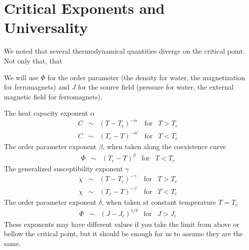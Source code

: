 


\section{Critical Exponents and Universality}
\label{sec:universality}

We noted that several thermodynamical quantities diverge on the critical point.
Not only that, that

We will use $\Phi$ for the order parameter (the density for water, the
magnetization for ferromagnets) and $J$ for the source field (pressure for
water, the external magnetic field for ferromagnets).

The heat capacity exponent $\alpha$
\begin{equation}
    \begin{array}{ccccc}
        C & \sim & {\left(T-T_c\right)}^{-\alpha}  & \mbox{for} & T > T_c \\
        C & \sim & {\left(T_c-T\right)}^{-\alpha'} & \mbox{for} & T < T_c
    \end{array}
\end{equation}
The order parameter exponent $\beta$, when taken along the coexistence curve 
\begin{equation}
    \begin{array}{ccccc}
        \Phi  & \sim & {\left(T_c-T\right)}^{\beta} & \mbox{for} & T < T_c
    \end{array}
\end{equation}
The generalized susceptibility exponent $\gamma$
\begin{equation}
    \begin{array}{ccccc}
        \chi  & \sim & {\left(T-T_c\right)}^{-\gamma}  & \mbox{for} & T > T_c \\
        \chi  & \sim & {\left(T_c-T\right)}^{-\gamma'} & \mbox{for} & T < T_c
    \end{array}
\end{equation}
The order parameter exponent $\delta$, when taken at constant temperature
$T=T_c$
\begin{equation}
    \begin{array}{ccccc}
        \Phi  & \sim & {\left(J-J_c\right)}^{1/\delta} & \mbox{for} & J > J_c
    \end{array}
\end{equation}
These exponents may have different values if you take the limit from above or
bellow the critical point, but it should be enough for us to assume they are
the same.

